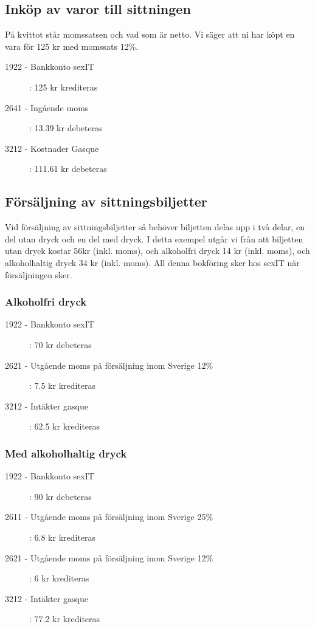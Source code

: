 \documentclass{article}
\begin{document}
\subsection{Inköp av varor till sittningen}
På kvittot står momssatsen och vad som är netto. Vi säger att ni har köpt en vara för 125 kr med momssats 12\%. 
\begin{description}
    \item [1922 - Bankkonto sexIT ]: 125 kr krediteras
    \item [2641 - Ingående moms]: 13.39 kr debeteras
    \item [3212 - Kostnader Gasque]: 111.61 kr debeteras
\end{description}

\subsection{Försäljning av sittningsbiljetter}
Vid försäljning av sittningsbiljetter så behöver biljetten delas upp i två delar, en del utan dryck och en del med dryck. I detta exempel utgår vi från att biljetten utan dryck kostar 56kr (inkl. moms), och alkoholfri dryck 14 kr (inkl. moms), och alkoholhaltig dryck 34 kr (inkl. moms). All denna bokföring sker hos sexIT när försäljningen sker.
\subsubsection{Alkoholfri dryck}
\begin{description}
    \item [1922 - Bankkonto sexIT ]: 70 kr debeteras
    \item [2621 - Utgående moms på försäljning inom Sverige 12\%]: 7.5 kr krediteras
    \item [3212 - Intäkter gasque]: 62.5 kr krediteras
\end{description}
\subsubsection{Med alkoholhaltig dryck}
\begin{description}
    \item [1922 - Bankkonto sexIT ]: 90 kr debeteras
    \item [2611 - Utgående moms på försäljning inom Sverige 25\%]: 6.8 kr krediteras
    \item [2621 - Utgående moms på försäljning inom Sverige 12\%]: 6 kr krediteras
    \item [3212 - Intäkter gasque]: 77.2 kr krediteras
\end{description}
\end{document}
